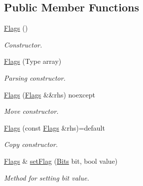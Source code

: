 \subsection*{Public Member Functions}
\begin{DoxyCompactItemize}
\item 
\mbox{\label{classDiameter_1_1AVP_1_1Header_1_1Flags_a727e454894ee69b06da8cf847e8c4339}} 
\hyperlink{classDiameter_1_1AVP_1_1Header_1_1Flags_a727e454894ee69b06da8cf847e8c4339}{Flags} ()
\begin{DoxyCompactList}\small\item\em Constructor. \end{DoxyCompactList}\item 
\hyperlink{classDiameter_1_1AVP_1_1Header_1_1Flags_aafe29286cfb1709d9bc5b23106e62d70}{Flags} (Type array)
\begin{DoxyCompactList}\small\item\em Parsing constructor. \end{DoxyCompactList}\item 
\mbox{\label{classDiameter_1_1AVP_1_1Header_1_1Flags_a111c335add6a1914d32b934c3a9a030f}} 
\hyperlink{classDiameter_1_1AVP_1_1Header_1_1Flags_a111c335add6a1914d32b934c3a9a030f}{Flags} (\hyperlink{classDiameter_1_1AVP_1_1Header_1_1Flags}{Flags} \&\&rhs) noexcept
\begin{DoxyCompactList}\small\item\em Move constructor. \end{DoxyCompactList}\item 
\hyperlink{classDiameter_1_1AVP_1_1Header_1_1Flags_a27e14a76ae84079c9d51b44fc6883628}{Flags} (const \hyperlink{classDiameter_1_1AVP_1_1Header_1_1Flags}{Flags} \&rhs)=default
\begin{DoxyCompactList}\small\item\em Copy constructor. \end{DoxyCompactList}\item 
\hyperlink{classDiameter_1_1AVP_1_1Header_1_1Flags}{Flags} \& \hyperlink{classDiameter_1_1AVP_1_1Header_1_1Flags_a4ba216d20eac1f0cab1573b6b354d33c}{set\+Flag} (\hyperlink{classDiameter_1_1AVP_1_1Header_1_1Flags_af24fa00d6135e01a5b58c9ae84245262}{Bits} bit, bool value)
\begin{DoxyCompactList}\small\item\em Method for setting bit value. \end{DoxyCompactList}\item 

\end{DoxyCompactItemize}
